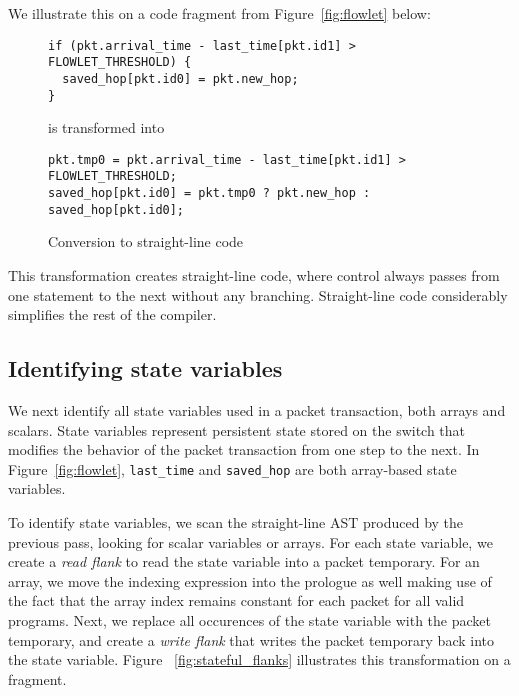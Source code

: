 We illustrate this on a code fragment from Figure~\ref{fig:flowlet} below:
\begin{figure}
\begin{tiny}
\begin{lstlisting}
if (pkt.arrival_time - last_time[pkt.id1] > FLOWLET_THRESHOLD) {
  saved_hop[pkt.id0] = pkt.new_hop;
}
\end{lstlisting}
\end{tiny}
\begin{center}
is transformed into
\end{center}
\begin{tiny}
\begin{lstlisting}
pkt.tmp0 = pkt.arrival_time - last_time[pkt.id1] > FLOWLET_THRESHOLD;
saved_hop[pkt.id0] = pkt.tmp0 ? pkt.new_hop : saved_hop[pkt.id0];
\end{lstlisting}
\end{tiny}
\caption{Conversion to straight-line code}
\label{fig:if_convert}
\end{figure}

This transformation creates straight-line code, where control always passes
from one statement to the next without any branching. Straight-line code
considerably simplifies the rest of the compiler.

\subsection{Identifying state variables}

We next identify all state variables used in a packet transaction, both arrays
and scalars. State variables represent persistent state stored on the switch
that modifies the behavior of the packet transaction from one step to the next.
In Figure~\ref{fig:flowlet}, \texttt{last\_time} and \texttt{saved\_hop} are
both array-based state variables.


To identify state variables, we scan the straight-line AST produced by the
previous pass, looking for scalar variables or arrays. For each state variable,
we create a \textit{read flank} to read the state variable into a packet
temporary. For an array, we move the indexing expression into the prologue as
well making use of the fact that the array index remains constant for each
packet for all valid \pktlanguage programs. Next, we replace all occurences of
the state variable with the packet temporary, and create a \textit{write flank}
that writes the packet temporary back into the state variable.  Figure
~\ref{fig:stateful_flanks} illustrates this transformation on a fragment.

